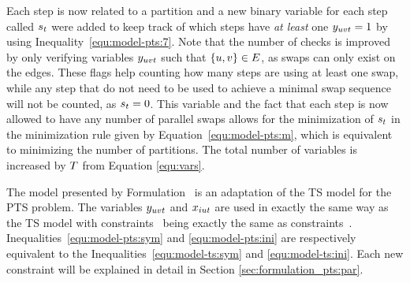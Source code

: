 \documentclass[msc]{ppgccufmg}    %
\begin{document}
Each step is now related to a partition and a new binary variable for each step 
called $s_{t}$ were added to keep track of which steps have \textit{at least} 
one $y_{uvt} = 1$ by using Inequality~\ref{equ:model-pts:7}.
Note that the number of checks is improved by only verifying variables $y_{uvt}$
such that $\{u,v\} \in E$, as swaps can only exist on the 
edges.
These flags help counting how many steps are using at least one swap, while any 
step that do not need to be used to achieve a minimal swap sequence will not be 
counted, as $s_{t} = 0$.
This variable and the fact that each step is now allowed to have any number of
parallel swaps allows for the minimization of $s_{t}$ in the minimization 
rule given by Equation~\ref{equ:model-pts:m}, which is equivalent to minimizing 
the number of partitions.
The total number of variables is increased by $T$ from Equation
\ref{equ:vars}.


The model presented by Formulation~ 
is an adaptation of the TS model for the PTS problem. 
The variables $y_{uvt}$ and $x_{iut}$ are used in exactly the same way as the 
TS model with constraints~ being 
exactly the same as constraints~.
Inequalities~\ref{equ:model-pts:sym} and \ref{equ:model-pts:ini} are respectively 
equivalent to the Inequalities~\ref{equ:model-ts:sym} and \ref{equ:model-ts:ini}.
Each new constraint will be explained in detail in Section \ref{sec:formulation_pts:par}.


\end{document}
